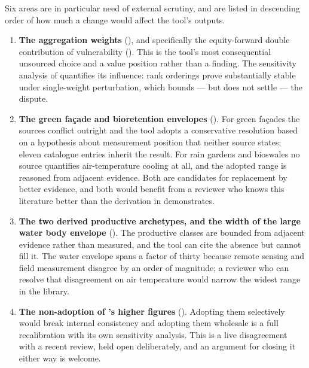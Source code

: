 Six areas are in particular need of external scrutiny, and are listed in
descending order of how much a change would affect the tool's outputs.

\begin{enumerate}
  \item \textbf{The aggregation weights} (), and
  specifically the equity-forward double contribution of vulnerability
  (). This is the tool's most consequential
  unsourced choice and a value position rather than a finding. The
  sensitivity analysis of  quantifies its
  influence: rank orderings prove substantially stable under single-weight
  perturbation, which bounds --- but does not settle --- the dispute.

  \item \textbf{The green fa\c{c}ade and bioretention envelopes}
  (). For green fa\c{c}ades the sources conflict outright
  and the tool adopts a conservative resolution based on a hypothesis about
  measurement position that neither source states; eleven catalogue entries
  inherit the result. For rain gardens and bioswales no source quantifies
  air-temperature cooling at all, and the adopted range is reasoned from
  adjacent evidence. Both are candidates for replacement by better evidence,
  and both would benefit from a reviewer who knows this literature better than
  the derivation in  demonstrates.

  \item \textbf{The two derived productive archetypes, and the width of the
  large water body envelope} ().
  The productive classes are bounded from adjacent evidence rather than
  measured, and the tool can cite the absence \parencite{kumar2024} but cannot
  fill it. The water envelope spans a factor of thirty because remote sensing
  and field measurement disagree by an order of magnitude; a reviewer who can
  resolve that disagreement on air temperature would narrow the widest range in
  the library.

  \item \textbf{The non-adoption of \textcite{kumar2024}'s higher figures}
  (). Adopting them selectively
  would break internal consistency and adopting them wholesale is a full
  recalibration with its own sensitivity analysis. This is a live disagreement
  with a recent review, held open deliberately, and an argument for closing it
  either way is welcome.


\end{enumerate}
